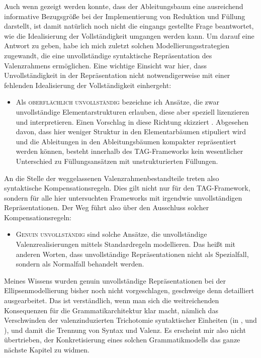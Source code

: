 Auch wenn gezeigt werden konnte, dass der Ableitungsbaum eine ausreichend informative Bezugsgröße bei der Implementierung von Reduktion und Füllung darstellt, ist damit natürlich noch nicht die eingangs gestellte Frage beantwortet, wie die Idealisierung der Vollständigkeit umgangen werden kann. Um darauf eine Antwort zu geben, habe ich mich zuletzt solchen Modellierungsstrategien zugewandt, die eine unvollständige syntaktische Repräsentation des Valenzrahmens ermöglichen. Eine wichtige Einsicht war hier, dass Unvollständigkeit in der Repräsentation nicht notwendigerweise mit einer fehlenden Idealisierung der Vollständigkeit einhergeht:
\begin{itemize}
  \item Als \textsc{oberflächlich unvollständig} bezeichne ich Ansätze, die zwar unvollständige Elementarstrukturen erlauben, diese aber speziell lizenzieren und interpretieren. Einen Vorschlag in diese Richtung skizziert \cite{Sarkar:97}. Abgesehen davon, dass hier weniger Struktur in den Elementarbäumen stipuliert wird und die Ableitungen in den Ableitungsbäumen kompakter repräsentiert werden können, besteht innerhalb des TAG-Frameworks kein wesentlicher Unterschied zu Füllungsansätzen mit unstrukturierten Füllungen.
\end{itemize}  
An die Stelle der weggelassenen Valenzrahmenbestandteile treten also syntaktische Kompensationsregeln. Dies gilt nicht nur für den TAG-Framework, sondern für alle hier untersuchten Frameworks mit irgendwie unvollständigen Repräsentationen. Der Weg führt also über den Ausschluss solcher Kompensationsregeln: 
\begin{itemize}   
  \item \textsc{Genuin unvollständig} sind solche Ansätze, die unvollständige Valenzrealisierungen mittels Standardregeln modellieren. Das heißt mit anderen Worten, dass unvollständige Repräsentationen nicht als Spezialfall, sondern als Normalfall behandelt werden. 
\end{itemize}
Meines Wissens wurden genuin unvollständige Repräsentationen bei der Ellipsenmodellierung bisher noch nicht vorgeschlagen, geschweige denn detailliert ausgearbeitet. Das ist verständlich, wenn man sich die weitreichenden  Konsequenzen für die Grammatikarchitektur klar macht, nämlich das Verschwinden der valenzinduzierten  Trichotomie syntaktischer Einheiten (in ,  und ), und damit die Trennung von Syntax und Valenz. Es erscheint mir also nicht übertrieben, der Konkretisierung eines solchen Grammatikmodells das ganze nächste Kapitel zu widmen.



  
